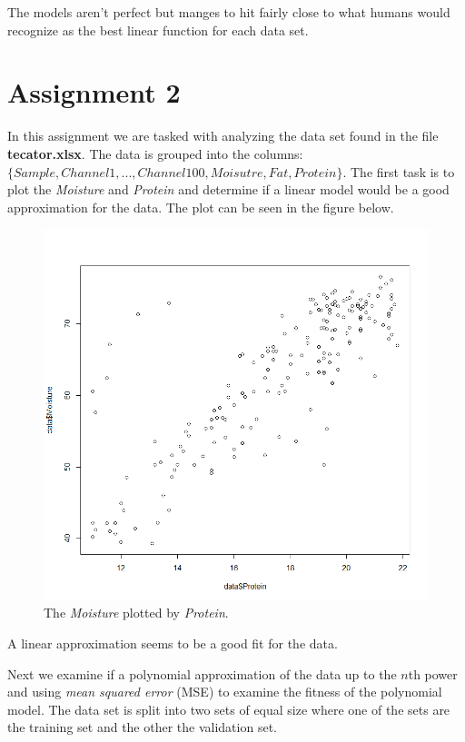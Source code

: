 \documentclass[a4paper,12pt]{article}
\begin{document}
The models aren't perfect but manges to hit fairly close to what humans would recognize as the best linear function for each data set.

\section{Assignment 2}

In this assignment we are tasked with analyzing the data set found in the file \textbf{tecator.xlsx}. The data is grouped into the columns: \( \{ Sample, Channel 1, ... , Channel 100, Moisutre, Fat, Protein \} \). The first task is to plot the \textit{Moisture} and \textit{Protein} and determine if a linear model would be a good approximation for the data. The plot can be seen in the figure below.

\begin{figure}[H]
\centering
\begin{minipage}[]{0.5\textwidth}
  \includegraphics[width=\textwidth]{figures/Lab2A2_data_plot.png}  
  \caption{The \textit{Moisture} plotted by \textit{Protein}.\label{fig:data plot} }
 \end{minipage}
\end{figure}

A linear approximation seems to be a good fit for the data.

Next we examine if a polynomial approximation of the data up to the \(n\)th power and using \textit{mean squared error} (MSE) to examine the fitness of the polynomial model. The data set is split into two sets of equal size where one of the sets are the training set and the other the validation set. 
\end{document}
